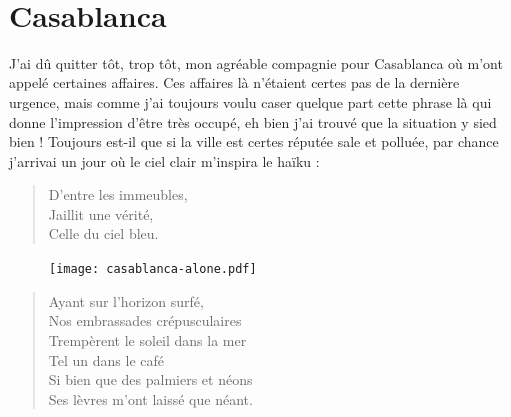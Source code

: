 \newpage{}
\thispagestyle{empty}
~
\vfill
\pagebreak


\section*{Casablanca}


\begin{prose}
  J’ai dû quitter tôt, trop tôt, mon agréable compagnie pour Casablanca où m’ont appelé certaines affaires. Ces affaires là n’étaient certes pas de la dernière urgence, mais comme j’ai toujours voulu caser quelque part cette phrase là qui donne l’impression d’être très occupé, eh bien j’ai trouvé que la situation y sied bien ! Toujours est-il que si la ville est certes réputée sale et polluée, par chance j’arrivai un jour où le ciel clair m’inspira le haïku :
\end{prose}

\begin{verse}\haiku
  D’entre les immeubles,\\  %
  Jaillit une vérité,\\  %
  Celle du ciel bleu.
\end{verse}

\begin{figure}[h]
  \centering
  \texttt{[image: casablanca-alone.pdf]}
  \captionsetup{labelformat=empty}
  \caption[Idéotexte de  (\textarabic{البيضاء})]{}
\end{figure}

\begin{verse}\sizain
  Ayant sur l’horizon surfé,\\ 
  Nos embrassades crépusculaires\\ 
  Trempèrent  le soleil dans la mer\\ 
  Tel un  dans le café\\ 
  Si bien que des palmiers et néons\\ 
  Ses lèvres m’ont laissé que néant.  %
\end{verse}

